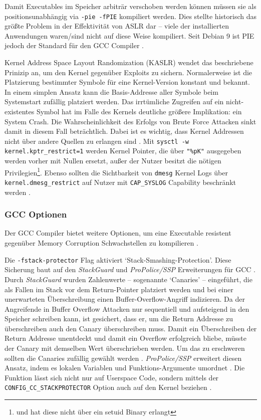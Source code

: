 Damit Executables im Speicher arbiträr verschoben werden können müssen sie als positionsunabhängig via \texttt{-pie -fPIE} kompiliert werden. Dies stellte historisch das größte Problem in der Effektivität von ASLR dar -- viele der installierten Anwendungen waren/sind nicht auf diese Weise kompiliert. Seit Debian 9 ist PIE jedoch der Standard für den GCC Compiler \cite{debian-9}.

Kernel Address Space Layout Randomization (KASLR) wendet das beschriebene Prinizip an, um den Kernel gegenüber Exploits zu sichern. Normalerweise ist die Platzierung bestimmter Symbole für eine Kernel-Version konstant und bekannt. In einem simplen Ansatz kann die Basis-Addresse aller Symbole beim Systemstart zufällig platziert werden. Das irrtümliche Zugreifen auf ein nicht-existentes Symbol hat im Falle des Kernels deutliche größere Implikation: ein System Crash. Die Wahrscheinlichkeit
des Erfolgs von Brute Force Attacken sinkt damit in diesem Fall beträchtlich. Dabei ist es wichtig, dass Kernel Addressen nicht über andere Quellen zu erlangen sind \cite{lwn-kaslr}. Mit \texttt{sysctl -w kernel.kptr\_restrict=1}  werden Kernel Pointer, die über \texttt{"\%pK"} ausgegeben werden vorher mit Nullen ersetzt, außer der Nutzer besitzt die nötigen Privilegien\footnote{und hat diese nicht über ein setuid Binary erlangt}. Ebenso sollten die Sichtbarkeit von \texttt{dmesg} Kernel Logs
über \texttt{kernel.dmesg\_restrict} auf Nutzer mit \texttt{CAP\_SYSLOG} Capability beschränkt werden \cite{sysctl-kernel}.


\subsubsection{GCC Optionen}

Der GCC Compiler bietet weitere Optionen, um eine Executable resistent gegenüber Memory Corruption Schwachstellen zu kompilieren \cite{deb-hardening}.

Die \texttt{-fstack-protector} Flag aktiviert `Stack-Smashing-Protection'. 
Diese Sicherung baut auf den \textit{StackGuard} und \textit{ProPolice/SSP} Erweiterungen für GCC \cite{stackguard, propolice}.
Durch \textit{StackGuard} wurden Zahlenwerte -- sogenannte `Canaries' -- eingeführt, die als Fallen im Stack vor dem Return-Pointer platziert werden und bei einer unerwarteten Überschreibung einen Buffer-Overflow-Angriff indizieren. Da der Angreifende in Buffer Overflow Attacken nur sequentiell und aufsteigend in den Speicher schreiben kann, ist gesichert, dass er, um die Return Addresse zu überschreiben auch den Canary überschreiben muss. Damit ein Überschreiben der Return Addresse unentdeckt und damit ein Overflow erfolgreich bliebe, müsste der Canary mit demselben Wert überschrieben werden. Um das zu erschweren sollten die Canaries zufällig gewählt werden \cite{stackguard}. 
\textit{ProPolice/SSP} erweitert diesen Ansatz, indem es lokalen Variablen und Funktions-Argumente umordnet \cite{propolice}.
Die Funktion lässt sich nicht nur auf Userspace Code, sondern mittels der \texttt{CONFIG\_CC\_STACKPROTECTOR} Option auch auf den Kernel beziehen \cite{ubuntu-security-features}.

